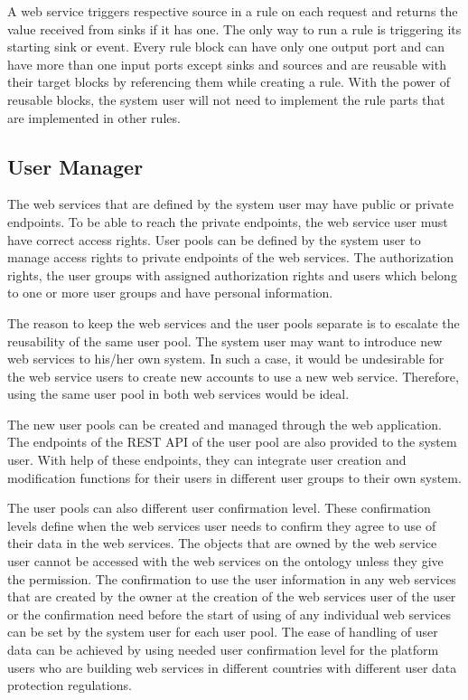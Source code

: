  A web service triggers respective source in a rule on each request and returns the value received from sinks if it has one. The only way to run a rule is triggering its starting sink or event. Every rule block can have only one output port and can have more than one input ports except sinks and sources and are reusable with their target blocks by referencing them while creating a rule. With the power of reusable blocks, the system user will not need to implement the rule parts that are implemented in other rules.

\subsection{User Manager}

The web services that are defined by the system user may have public or private endpoints. To be able to reach the private endpoints, the web service user must have correct access rights. User pools can be defined by the system user to manage access rights to private endpoints of the web services. The authorization rights, the user groups with assigned authorization rights and users which belong to one or more user groups and have personal information. 

The reason to keep the web services and the user pools separate is to escalate the reusability of the same user pool. The system user may want to introduce new web services to his/her own system. In such a case, it would be undesirable for the web service users to create new accounts to use a new web service. Therefore, using the same user pool in both web services would be ideal. 

The new user pools can be created and managed through the web application. The endpoints of the REST API of the user pool are also provided to the system user. With help of these endpoints, they can integrate user creation and modification functions for their users in different user groups to their own system. 

The user pools can also different user confirmation level. These confirmation levels define when the web services user needs to confirm they agree to use of their data in the web services. The objects that are owned by the web service user cannot be accessed with the web services on the ontology unless they give the permission. The confirmation to use the user information in any web services that are created by the owner at the creation of the web services user of the user or the confirmation need before the start of using of any individual web services can be set by the system user for each user pool. The ease of handling of user data can be achieved by using needed user confirmation level for the platform users who are building web services in different countries with different user data protection regulations.


